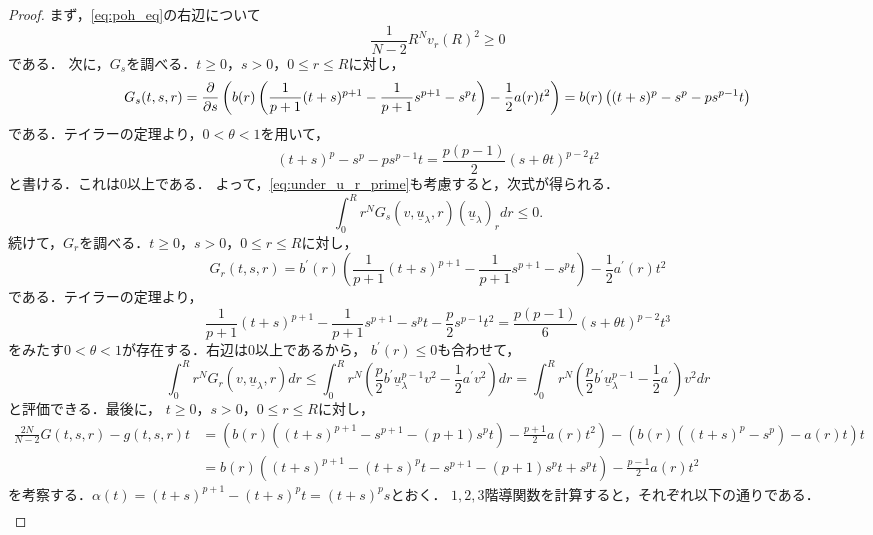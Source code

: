 \begin{proof}
 まず，\eqref{eq:poh_eq}の右辺について
 \begin{equation}
  \frac{1}{N-2} R^N v_r(R)^2 \geq 0 \label{eq:poh_ineq_0}
 \end{equation}
 である．
 次に，$G_s$を調べる．$t \geq 0 $，$s > 0$，$0 \leq r \leq R$に対し，
 \[
  G_s(t, s, r) = \frac{\partial }{\partial s} \left( b(r) \left( \frac{1}{p+1}
 (t+s)^{p+1} - \frac{1}{p+1}s^{p+1} - s^pt \right)
 - \frac{1}{2}a(r) t^2 \right) = b(r) \left( (t+s)^p - s^p -p s^{p-1}
 t \right)
 \]
 である．テイラーの定理より，$0 < \theta < 1$を用いて，
 \[
  (t+s)^p - s^p - ps^{p-1} t = \frac{p(p-1)}{2} (s + \theta t)^{p-2} t^2
 \]
 と書ける．これは$0$以上である．
 よって，\eqref{eq:under_u_r_prime}も考慮すると，次式が得られる．
 \begin{equation}
  \int_0^R r^N G_s(v, \underline{u}_\lambda, r)
   (\underline{u}_\lambda)_r dr \leq 0. \label{eq:poh_ineq_1}
 \end{equation}
 続けて，$G_r$を調べる．$t \geq 0 $，$s > 0$，$0 \leq r \leq R$に対し，
 \[
  G_r(t, s, r) = b^\prime(r) \left( \frac{1}{p+1} (t+s)^{p+1} -
 \frac{1}{p+1} s^{p+1} - s^{p} t \right) - \frac{1}{2} a^\prime(r) t^2
 \]
 である．テイラーの定理より，
 \[
  \frac{1}{p+1} (t+s)^{p+1} - \frac{1}{p+1} s^{p+1} -s^p t -
 \frac{p}{2} s^{p-1} t^2 = \frac{p(p-1)}{6} (s + \theta t)^{p-2} t^3
 \]
 をみたす$0 < \theta < 1$が存在する．右辺は$0$以上であるから，
 $b^\prime(r) \leq 0$も合わせて，
 \begin{equation}
  \int_0^R r^N G_r(v, \underline{u}_\lambda, r) dr \leq \int_0^R
   r^N \left( \frac{p}{2} b^\prime \underline{u}_\lambda^{p-1} v^2 -
    \frac{1}{2} a^\prime v^2 \right)dr = 
   \int_0^R r^N \left( \frac{p}{2} b^\prime \underline{u}_\lambda^{p-1} -
    \frac{1}{2} a^\prime \right) v^2 dr \label{eq:poh_ineq_2} 
 \end{equation}
 と評価できる．最後に，
 $t \geq 0 $，$s > 0$，$0 \leq r \leq R$に対し，
 \begin{align*}
  \frac{2N}{N-2}G(t, s, r) - g(t, s, r)t 
  &= \left( b(r) \left( (t+s)^{p+1} - s^{p+1} - (p+1)s^p t \right) -
  \frac{p+1}{2} a(r) t^2 \right) - \left( b(r) \left( (t+s)^p - s^p
  \right) - a(r) t \right) t \\
  &= b(r) \left( (t+s)^{p+1} - (t+s)^p t - s^{p+1} - (p+1)s^p t + s^p
  t \right) -\frac{p-1}{2} a(r) t^2
 \end{align*}
 を考察する．$\alpha(t) = (t+s)^{p+1} - (t+s)^p t = (t+s)^p s$とおく．
 $1, 2, 3$階導関数を計算すると，それぞれ以下の通りである．
 \begin{align*}

\end{align*}
\end{proof}
